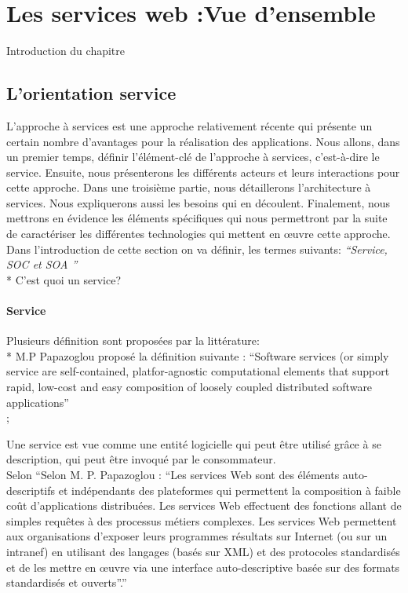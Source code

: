 
\chapter{Les services web :Vue d'ensemble}
Introduction du chapitre %

    \section{L'orientation service}
    	L'approche à services est une approche relativement récente qui présente un certain nombre d'avantages pour 
	la réalisation des applications. Nous allons, dans un premier temps, définir l'élément-clé de l'approche 
	à services, c'est-à-dire le service. Ensuite, nous présenterons les différents acteurs et leurs interactions 
	pour cette approche. Dans une troisième partie, nous détaillerons l'architecture à services. Nous expliquerons 
	aussi les besoins qui en découlent. Finalement, nous mettrons en évidence les éléments spécifiques qui nous 
	permettront par la suite de caractériser les différentes technologies qui mettent en œuvre cette approche.\\

	Dans l'introduction de cette section on va définir,  les termes suivants: \emph{``Service, SOC et SOA ''}\\
	    * C'est quoi un service?\\

	\subsubsection{Service}
	    Plusieurs définition sont proposées par la littérature:\\

	    * M.P Papazoglou proposé la définition suivante :\cite{Papazoglou:what_is_a_service?} ``Software 
	    services (or simply service are self-contained, platfor-agnostic computational elements that support 
	    rapid, low-cost and easy composition of loosely coupled distributed software applications''\\	;
	    
	    Une service est vue comme une entité logicielle qui peut être utilisé grâce à se description, 
	    qui peut être invoqué par le consommateur. \\

	    Selon \cite{Papazoglou:2007:SOA:1265289.1265298} ``Selon M. P. Papazoglou : ``Les services Web sont 
	    des éléments auto-descriptifs  et indépendants des plateformes qui permettent la composition à faible 
	    coût d'applications  distribuées. Les services Web effectuent des fonctions allant  de simples requêtes à  
	    des processus métiers complexes. Les services Web permettent aux organisations d'exposer  leurs programmes 
	    résultats sur Internet (ou sur un intranef) en utilisant des langages  (basés sur XML) et des protocoles 
	    standardisés et de les mettre en œuvre via une interface auto-descriptive basée sur des formats 
	    standardisés et ouverts''.''\\

